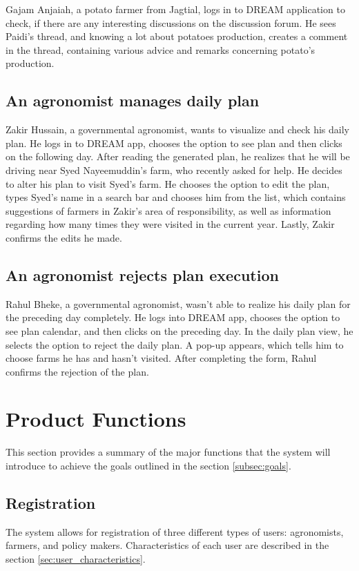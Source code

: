 Gajam Anjaiah, a potato farmer from Jagtial, logs in to DREAM application to check, if there are any interesting discussions on the discussion forum. He sees Paidi's thread, and knowing a lot about potatoes production, creates a comment in the thread, containing various advice and remarks concerning potato's production.

\subsection*{An agronomist manages daily plan}
Zakir Hussain, a governmental agronomist, wants to visualize and check his daily plan. He logs in to DREAM app, chooses the option to see plan and then clicks on the following day. After reading the generated plan, he realizes that he will be driving near Syed Nayeemuddin's farm, who recently asked for help. He decides to alter his plan to visit Syed's farm. He chooses the option to edit the plan, types Syed's name in a search bar and chooses him from the list, which contains suggestions of farmers in Zakir's area of responsibility, as well as information regarding how many times they were visited in the current year. Lastly, Zakir confirms the edits he made.

\subsection*{An agronomist rejects plan execution}
Rahul Bheke, a governmental agronomist, wasn't able to realize his daily plan for the preceding day completely. He logs into DREAM app, chooses the option to see plan calendar, and then clicks on the preceding day. In the daily plan view, he selects the option to reject the daily plan. A pop-up appears, which tells him to choose farms he has and hasn't visited. After completing the form, Rahul confirms the rejection of the plan.

\section{Product Functions}

This section provides a summary of the major functions that the system will introduce to achieve the goals outlined in the section \ref{subsec:goals}.

\subsection{Registration}
The system allows for registration of three different types of users: agronomists, farmers, and policy makers. Characteristics of each user are described in the section \ref{sec:user_characteristics}.

